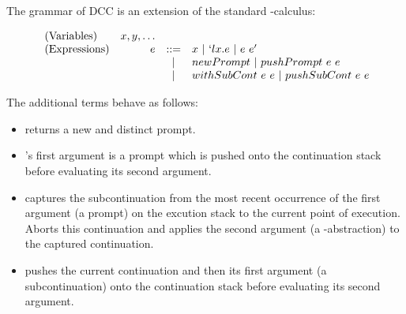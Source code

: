 The grammar of DCC is an extension of the standard \lam-calculus:

\begin{figure}[!h]
\begin{definition}
\[
\begin{array}{lrcl}
\textrm{(Variables)} & x, y, \dots \\
\textrm{(Expressions)} & e & ::= & x\ |\ `lx.e\ |\ e\ e^\prime \\
                       &   &  |  &  newPrompt\ |\ pushPrompt\ e\ e \\
                       &   &  |  &  withSubCont\ e\ e\ |\ pushSubCont\ e\ e
\end{array}
\]
\end{definition}
\end{figure}

The additional terms behave as follows:
\begin{itemize}
\item {} returns a new and distinct prompt.
\item {}'s first argument is a prompt which is pushed onto the continuation stack before evaluating its second argument. 
\item {} captures the subcontinuation from the most recent occurrence of the first argument (a prompt) on the excution stack to the current point of execution. Aborts this continuation and applies the second argument (a \lam-abstraction) to the captured continuation.
\item {} pushes the current continuation and then its first argument (a subcontinuation) onto the continuation stack before evaluating its second argument.
\end{itemize}
